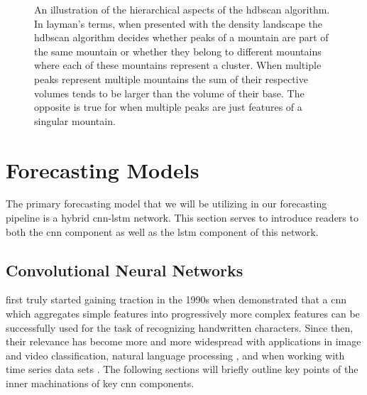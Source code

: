 \begin{figure}[H]
\begin{adjustwidth}{-3.0cm}{-3.0cm}
{                        \label{fig:HDBSCAN-Illustration-2.4}
                } \quad
                \caption{An illustration of the hierarchical aspects of the \gls{hdbscan} algorithm. In layman's terms, when presented with the density landscape the \gls{hdbscan} algorithm decides whether peaks of a mountain are part of the same mountain or whether they belong to different mountains where each of these mountains represent a cluster. When multiple peaks represent multiple mountains the sum of their respective volumes tends to be larger than the volume of their base. The opposite is true for when multiple peaks are just features of a singular mountain.}
                \label{fig:HDBSCAN-Illustration}
        \end{adjustwidth}
\end{figure}

\clearpage

\section{Forecasting Models}
\label{sec:Background-Information:Forecasting-Models}
The primary forecasting model that we will be utilizing in our forecasting pipeline is a hybrid \gls{cnn-lstm} network. This section serves to introduce readers to both the \gls{cnn} component as well as the \gls{lstm} component of this network.

\subsection{Convolutional Neural Networks}
\label{subsec:Background-Information:Forecasting-Models:Convolutional-Neural-Networks}
 first truly started gaining traction in the 1990s when \citet{LeCun} demonstrated that a \gls{cnn} which aggregates simple features into progressively more complex features can be successfully used for the task of recognizing handwritten characters. Since then, their relevance has become more and more widespread with applications in image and video classification, natural language processing \cite{Collobert}, and when working with time series data sets \cite{Tsantekidis}. The following sections will briefly outline key points of the inner machinations of key \gls{cnn} components.

